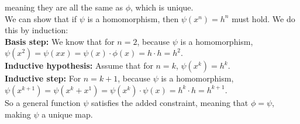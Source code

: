 \documentclass[12pt]{article}
\begin{document}
    meaning they are all the same as $\phi$, which is unique. \\
    We can show that if $\psi$ is a homomorphism,
    then $\psi(x^n) = h^n$ must hold.
    We do this by induction: \\
    \textbf{Basis step:}
    We know that for $n = 2$,
    because $\psi$ is a homomorphism,
    $\psi(x^2) = \psi(xx)
    = \psi(x) \cdot \phi(x) = h \cdot h = h^2$. \\
    \textbf{Inductive hypothesis:}
    Assume that for $n = k$, $\psi(x^k) = h^k$. \\ 
    \textbf{Inductive step:}
    For $n = k + 1$, because $\psi$ is a homomorphism,
    $\psi(x^{k + 1}) = \psi(x^k + x^1)
    = \psi(x^k) \cdot \psi(x) = h^k \cdot h = h^{k+1}$. \\
    So a general function $\psi$ satisfies the added constraint,
    meaning that $\phi = \psi$,
    making $\psi$ a unique map.
\end{document}
